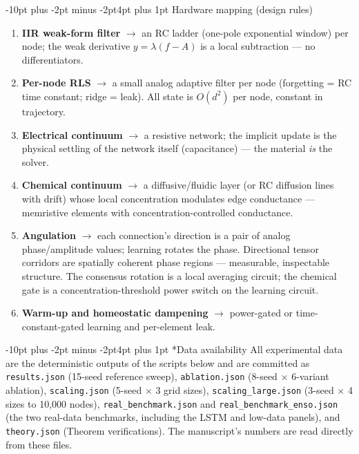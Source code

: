 \documentclass[10pt]{article}
\makeatletter
\renewcommand\subsection{\@startsection{subsection}{2}{\z@}%
  {-10pt plus -2pt minus -2pt}{4pt plus 1pt}%
  {\normalfont\bfseries\normalsize}}
\makeatother
\begin{document}
\subsection{Hardware mapping (design rules)}
\begin{enumerate}
\item \textbf{IIR weak-form filter} $\to$ an RC ladder (one-pole exponential window)
per node; the weak derivative $y = \lambda(f - A)$ is a local subtraction --- no
differentiators.
\item \textbf{Per-node RLS} $\to$ a small analog adaptive filter per node (forgetting =
RC time constant; ridge = leak). All state is $O(d^2)$ per node, constant in
trajectory.
\item \textbf{Electrical continuum} $\to$ a resistive network; the implicit update is
the physical settling of the network itself (capacitance) --- the material \emph{is}
the solver.
\item \textbf{Chemical continuum} $\to$ a diffusive/fluidic layer (or RC diffusion
lines with drift) whose local concentration modulates edge conductance --- memristive
elements with concentration-controlled conductance.
\item \textbf{Angulation} $\to$ each connection's direction is a pair of analog
phase/amplitude values; learning rotates the phase. Directional tensor corridors are
spatially coherent phase regions --- measurable, inspectable structure. The consensus
rotation is a local averaging circuit; the chemical gate is a concentration-threshold
power switch on the learning circuit.
\item \textbf{Warm-up and homeostatic dampening} $\to$ power-gated or
time-constant-gated learning and per-element leak.
\end{enumerate}

\subsection*{Data availability}
All experimental data are the deterministic outputs of the scripts below and are
committed as \texttt{results.json} (15-seed reference sweep), \texttt{ablation.json}
(8-seed $\times$ 6-variant ablation), \texttt{scaling.json} (5-seed $\times$
3 grid sizes), \texttt{scaling\_large.json} (3-seed $\times$ 4 sizes to
10,000 nodes), \texttt{real\_benchmark.json} and \texttt{real\_benchmark\_enso.json}
(the two real-data benchmarks, including the LSTM and low-data panels), and
\texttt{theory.json} (Theorem verifications). The manuscript's numbers are read
directly from these files.
\end{document}
